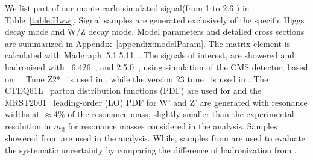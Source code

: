 We list part of our monte carlo simulated signal(from 1 \TeVcc to 2.6 \TeVcc) 
in 
Table~\ref{table:Hww}. 
Signal samples are generated exclusively of the specific 
Higgs decay mode and W/Z decay mode. 
Model parameters and detailed cross sections are summarized in 
Appendix~\ref{appendix:modelParam}.
The matrix element is calculated with Madgraph~5.1.5.11~\cite{madgraph}. 
The signals of interest,
are showered and hadronized with 
\PYTHIA~6.426~\cite{pythia}, and \HERWIG{++} 2.5.0~\cite{herwig}, 
using simulation of the
CMS detector, based on \GEANTfour~\cite{refGEANT}. Tune
Z2*~\cite{bib_tunez1}
is used in \PYTHIA, while the version 23 tune~\cite{herwig} is used in
\HERWIG{++}. The CTEQ61L~\cite{cteq} parton distribution functions
(PDF) are used for \PYTHIA and the MRST2001~\cite{mrst} leading-order
(LO) PDF for \HERWIG{++}
W' and Z' are generated with resonance widths
at $\approx$4\% of the resonance mass, slightly smaller than
the experimental resolution in $m_\mathrm{jj}$ for resonance masses
considered in the analysis. Samples showered from
 \PYTHIA are used in the analysis. %
While, samples from \HERWIG{++} are used to evaluate the systematic 
uncertainty by comparing the difference of hadronization from \PYTHIA.







